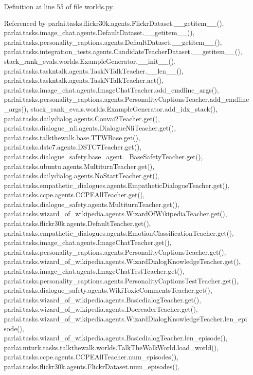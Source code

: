 Definition at line 55 of file worlds.\+py.



Referenced by parlai.\+tasks.\+flickr30k.\+agents.\+Flickr\+Dataset.\+\_\+\+\_\+getitem\+\_\+\+\_\+(), parlai.\+tasks.\+image\+\_\+chat.\+agents.\+Default\+Dataset.\+\_\+\+\_\+getitem\+\_\+\+\_\+(), parlai.\+tasks.\+personality\+\_\+captions.\+agents.\+Default\+Dataset.\+\_\+\+\_\+getitem\+\_\+\+\_\+(), parlai.\+tasks.\+integration\+\_\+tests.\+agents.\+Candidate\+Teacher\+Dataset.\+\_\+\+\_\+getitem\+\_\+\+\_\+(), stack\+\_\+rank\+\_\+evals.\+worlds.\+Example\+Generator.\+\_\+\+\_\+init\+\_\+\+\_\+(), parlai.\+tasks.\+taskntalk.\+agents.\+Task\+N\+Talk\+Teacher.\+\_\+\+\_\+len\+\_\+\+\_\+(), parlai.\+tasks.\+taskntalk.\+agents.\+Task\+N\+Talk\+Teacher.\+act(), parlai.\+tasks.\+image\+\_\+chat.\+agents.\+Image\+Chat\+Teacher.\+add\+\_\+cmdline\+\_\+args(), parlai.\+tasks.\+personality\+\_\+captions.\+agents.\+Personality\+Captions\+Teacher.\+add\+\_\+cmdline\+\_\+args(), stack\+\_\+rank\+\_\+evals.\+worlds.\+Example\+Generator.\+add\+\_\+idx\+\_\+stack(), parlai.\+tasks.\+dailydialog.\+agents.\+Convai2\+Teacher.\+get(), parlai.\+tasks.\+dialogue\+\_\+nli.\+agents.\+Dialogue\+Nli\+Teacher.\+get(), parlai.\+tasks.\+talkthewalk.\+base.\+T\+T\+W\+Base.\+get(), parlai.\+tasks.\+dstc7.\+agents.\+D\+S\+T\+C7\+Teacher.\+get(), parlai.\+tasks.\+dialogue\+\_\+safety.\+base\+\_\+agent.\+\_\+\+Base\+Safety\+Teacher.\+get(), parlai.\+tasks.\+ubuntu.\+agents.\+Multiturn\+Teacher.\+get(), parlai.\+tasks.\+dailydialog.\+agents.\+No\+Start\+Teacher.\+get(), parlai.\+tasks.\+empathetic\+\_\+dialogues.\+agents.\+Empathetic\+Dialogue\+Teacher.\+get(), parlai.\+tasks.\+ccpe.\+agents.\+C\+C\+P\+E\+All\+Teacher.\+get(), parlai.\+tasks.\+dialogue\+\_\+safety.\+agents.\+Multiturn\+Teacher.\+get(), parlai.\+tasks.\+wizard\+\_\+of\+\_\+wikipedia.\+agents.\+Wizard\+Of\+Wikipedia\+Teacher.\+get(), parlai.\+tasks.\+flickr30k.\+agents.\+Default\+Teacher.\+get(), parlai.\+tasks.\+empathetic\+\_\+dialogues.\+agents.\+Emotion\+Classification\+Teacher.\+get(), parlai.\+tasks.\+image\+\_\+chat.\+agents.\+Image\+Chat\+Teacher.\+get(), parlai.\+tasks.\+personality\+\_\+captions.\+agents.\+Personality\+Captions\+Teacher.\+get(), parlai.\+tasks.\+wizard\+\_\+of\+\_\+wikipedia.\+agents.\+Wizard\+Dialog\+Knowledge\+Teacher.\+get(), parlai.\+tasks.\+image\+\_\+chat.\+agents.\+Image\+Chat\+Test\+Teacher.\+get(), parlai.\+tasks.\+personality\+\_\+captions.\+agents.\+Personality\+Captions\+Test\+Teacher.\+get(), parlai.\+tasks.\+dialogue\+\_\+safety.\+agents.\+Wiki\+Toxic\+Comments\+Teacher.\+get(), parlai.\+tasks.\+wizard\+\_\+of\+\_\+wikipedia.\+agents.\+Basicdialog\+Teacher.\+get(), parlai.\+tasks.\+wizard\+\_\+of\+\_\+wikipedia.\+agents.\+Docreader\+Teacher.\+get(), parlai.\+tasks.\+wizard\+\_\+of\+\_\+wikipedia.\+agents.\+Wizard\+Dialog\+Knowledge\+Teacher.\+len\+\_\+episode(), parlai.\+tasks.\+wizard\+\_\+of\+\_\+wikipedia.\+agents.\+Basicdialog\+Teacher.\+len\+\_\+episode(), parlai.\+mturk.\+tasks.\+talkthewalk.\+worlds.\+Talk\+The\+Walk\+World.\+load\+\_\+world(), parlai.\+tasks.\+ccpe.\+agents.\+C\+C\+P\+E\+All\+Teacher.\+num\+\_\+episodes(), parlai.\+tasks.\+flickr30k.\+agents.\+Flickr\+Dataset.\+num\+\_\+episodes(), 
